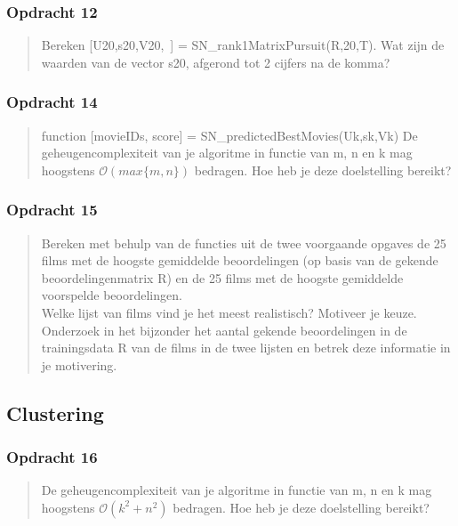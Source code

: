 \documentclass[11pt, a4paper, titlepage, openright]{article}
\begin{document}
	\subsubsection{Opdracht 12}
    \begin{quote}
        Bereken [U20,s20,V20,~] = SN\_rank1MatrixPursuit(R,20,T). Wat zijn de waarden van de vector s20, afgerond tot 2 cijfers na de komma?
    \end{quote}

	\subsubsection{Opdracht 14}
    \begin{quote}
        function [movieIDs, score] = SN\_predictedBestMovies(Uk,sk,Vk)
        De geheugencomplexiteit van je algoritme in functie van m, n en k mag hoogstens \(\mathcal{O}(max\{m, n\})\) bedragen.
        Hoe heb je deze doelstelling bereikt?
    \end{quote}

	\subsubsection{Opdracht 15}
    \begin{quote}
        Bereken met behulp van de functies uit de twee voorgaande opgaves de 25 films met de hoogste gemiddelde beoordelingen
        (op basis van de gekende beoordelingenmatrix R) en de 25 films met de hoogste gemiddelde voorspelde beoordelingen. \\
        Welke lijst van films vind je het meest realistisch? Motiveer je keuze. Onderzoek in het bijzonder het aantal gekende
        beoordelingen in de trainingsdata R van de films in de twee lijsten en betrek deze informatie in je motivering.
    \end{quote}


	\subsection{Clustering}

	\subsubsection{Opdracht 16}
    \begin{quote}
        De geheugencomplexiteit van je algoritme in functie van m, n en k mag hoogstens \(\mathcal{O}(k^2 + n^2)\) bedragen.
        Hoe heb je deze doelstelling bereikt?
    \end{quote}
\end{document}
